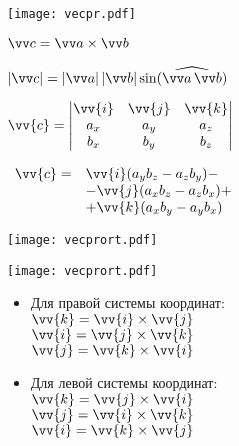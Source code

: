 \documentclass[10pt]{beamer}
\begin{document}
{
	{
		\texttt{[image: vecpr.pdf]}
		
		
	}
	{
		$\VV{c} = \VV{a} \times \VV{b} $
		
		$\ABS{\VV{c}} = \ABS{\VV{a}}\ABS{\VV{b}}\sin( \widehat{\VV{a}\, \VV{b}} ) $
		
		
		\hfill	
		
		$\vv{c} = \begin{vmatrix}
			\vv{i} & \vv{j} & \vv{k} \\
			a_x & a_y & a_z          \\
			b_x & b_y & b_z          \\
		\end{vmatrix}$	
		
		
		\hfill
		
	
		
		\hfill
		
		
		$\begin{array}{rl}
			\vv{c} = & \vv{i}(a_yb_z-a_zb_y) - \\
			& - \vv{j}(a_xb_z-a_zb_x) + \\
			& + \vv{k}({a_xb_y-a_yb_x})
		\end{array}   $
	}
	
}


{
	{
		\texttt{[image: vecprort.pdf]}
		
		\texttt{[image: vecprort.pdf]}
	}
	{
		\begin{itemize}
			\item {Для правой системы координат: \\
			$\vv{k}=\vv{i}\times\vv{j}$ \\
			$\vv{i}=\vv{j}\times\vv{k}$ \\
			$\vv{j}=\vv{k}\times\vv{i}$}
			\item {Для левой системы координат: \\
			$\vv{k}=\vv{j}\times\vv{i}$\\
			$\vv{j}=\vv{i}\times\vv{k}$\\
			$\vv{i}=\vv{k}\times\vv{j}$\\}
		\end{itemize}
	}
}
\end{document}
